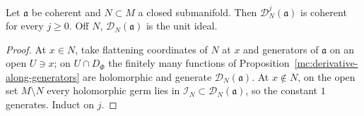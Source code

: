 \begin{corollary}
\label{mc:derivative-along-coherent}
\leanok
Let \(\mathfrak a\) be coherent and \(N\subset M\) a closed submanifold. Then \(\mathcal D_N^j(\mathfrak a)\) is coherent for every \(j\ge0\). Off \(N\),
\(\mathcal D_N(\mathfrak a)\) is the unit ideal.
\end{corollary}
\begin{proof}
\leanok
At \(x\in N\), take flattening coordinates of \(N\) at \(x\) and generators of \(\mathfrak a\) on an open \(U\ni x\); on \(U\cap D_\Phi\) the finitely many functions of
Proposition~\ref{mc:derivative-along-generators} are holomorphic and generate \(\mathcal D_N(\mathfrak a)\). At \(x\notin N\), on the open set \(M\setminus N\) every
holomorphic germ lies in \(\mathcal I_N\subset\mathcal D_N(\mathfrak a)\), so the constant \(1\) generates. Induct on \(j\).
\end{proof}
